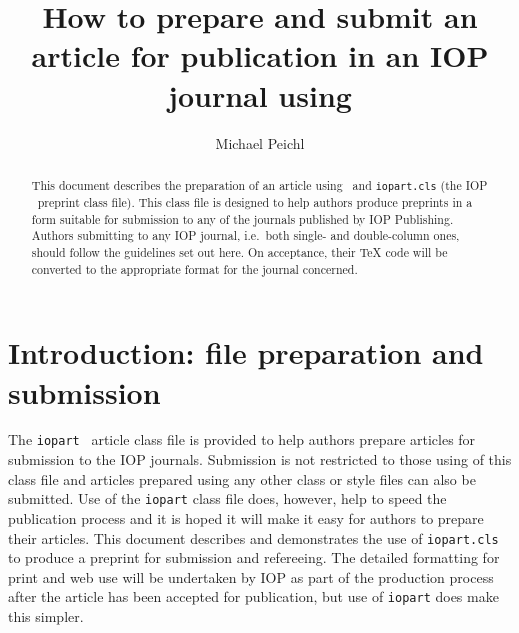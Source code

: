 \documentclass[12pt]{iopart}
\begin{document}
\title[Author guidelines for IOP journals in  \LaTeXe]{How to prepare and submit an article for 
publication in an IOP journal using \LaTeXe}

\author{Michael Peichl}

\address{IOP 
Publishing, Dirac
House, Temple Back, Bristol BS1 6BE, UK}
\begin{abstract}
This document describes the  preparation of an article using \LaTeXe\ and 
\verb"iopart.cls" (the IOP \LaTeXe\ preprint class file).
This class file is designed to help 
authors produce preprints in a form suitable for submission to any of the
journals published by IOP Publishing.
Authors submitting to any IOP journal, i.e.\ 
both single- and double-column ones, should follow the guidelines set out here. 
On acceptance, their TeX code will be converted to 
the appropriate format for the journal concerned.

\end{abstract}

\maketitle

\section{Introduction: file preparation and submission}
The \verb"iopart" \LaTeXe\ article class file is provided to help authors prepare articles for submission to the IOP journals. Submission is not restricted to those using of this class file and articles prepared using any other class or style files can also be submitted. Use of the \verb"iopart" class file does, however, help to speed the publication process and it is hoped it will make it easy for authors to prepare their articles. This document describes and demonstrates the use of \verb"iopart.cls" to produce a preprint for submission and refereeing. The detailed formatting for print and web use will be undertaken by IOP as part of the production process after the article has been accepted for publication, but use of \verb"iopart" does make this simpler.
\end{document}
